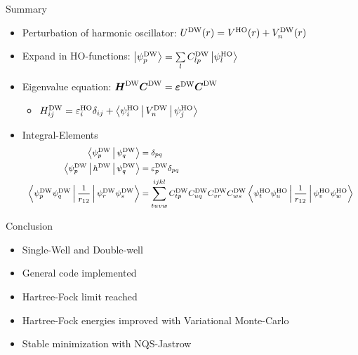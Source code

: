 \documentclass[10pt, t]{beamer}
\begin{document}
\begin{frame}[fragile]{Summary}
    \begin{itemize}
        \item Perturbation of harmonic oscillator: $\UDW(r) = \VHO(r) + \VDW_n(r)$
        \item Expand in HO-functions: $\ket{\psiDW_p} = \sumll{l}C^{\text{DW}}_{lp}\ket{\psiHO_l}$
        \item Eigenvalue equation: $\blds{H}^{\text{DW}}\blds{C}^{\text{DW}} =
            \blds{\varepsilon^{\text{DW}}}\blds{C}^{\text{DW}}$
            \begin{itemize}
                \item $H^{\text{DW}}_{ij} = \veps^{\text{HO}}_i\delta_{ij} +
                    \Braket{\psiHO_i|\VDW_n|\psiHO_j}$
            \end{itemize}
        \item Integral-Elements
        \begin{equation*}
            \footnotesize
            \begin{aligned}
                \Braket{\psiDW_p|\psiDW_q} &= \delta_{pq} \\
                \Braket{\psiDW_p|h^{\text{DW}}|\psiDW_q} &=
                \varepsilon^{\text{DW}}_p\delta_{pq} \\
                \Braket{\psiDW_p\psiDW_q|\frac{1}{r_{12}}|\psiDW_r\psiDW_s} &=
                \suml{tuvw}{ijkl} C^{\text{DW}}_{tp}C^{\text{DW}}_{uq}C^{\text{DW}}_{vr}C^{\text{DW}}_{ws}
                \Braket{\psiHO_t\psiHO_u|\frac{1}{r_{12}}|\psiHO_v\psiHO_w}
            \end{aligned}
        \end{equation*}
    \end{itemize}
\end{frame}

\begin{frame}[fragile]{Conclusion}
    \begin{itemize}[<+->]
        \item Single-Well and Double-well
        \item General \CC code implemented
        \item Hartree-Fock limit reached
        \item Hartree-Fock energies improved with Variational Monte-Carlo
        \item Stable minimization with NQS-Jastrow
    \end{itemize}
\end{frame}
\end{document}
